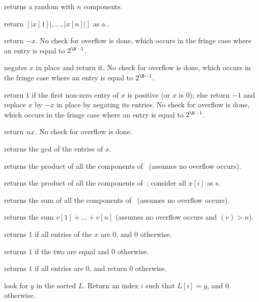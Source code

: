  returns a random  with $n$ components.

 return $[|x[1]|,\ldots,|x[n]|]$ as a .

 return $-x$. No check for overflow is done, which
occurs in the fringe case where an entry is equal to $2^{\B-1}$.

 negates $x$ in place and return it. No check
for overflow is done, which occurs in the fringe case where an entry is equal
to $2^{\B-1}$.

 return $1$ if the first non-zero entry of
$x$ is positive (or $x$ is $0$); else return $-1$ and replace $x$ by $-x$ in
place by negating its entries. No check for overflow is done, which occurs in
the fringe case where an entry is equal to $2^{\B-1}$.



 return $n\*x$. No check for overflow is
done.

 returns the gcd of the entries of $x$.


 returns the product of all the components
of~ (assumes no overflow occurs).

 returns the product of all the components
of~; consider all $x[i]$ as s.

 returns the sum of all the components
of~ (assumes no overflow occurs).

 returns the sum $v[1] + \dots + v[n]$
(assumes no overflow occurs and $(v) > n$).

 returns 1 if all entries of the  $x$ are $0$,
and $0$ otherwise.

 returns $1$ if the two  are equal
and $0$ otherwise.

 returns $1$ if all entries are $0$, and return
$0$ otherwise.

 look for $y$ in the sorted
 $L$. Return an index $i$ such that $L[i] = y$, and  $0$ otherwise.

